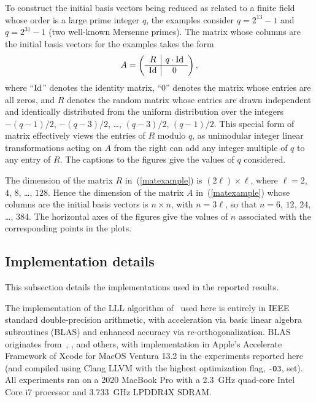 \documentclass{article}
\def\Id{\rm Id}
\begin{document}
To construct the initial basis vectors being reduced
as related to a finite field whose order is a large prime integer $q$,
the examples consider $q = 2^{13} - 1$ and $q = 2^{31} - 1$
(two well-known Mersenne primes).
The matrix whose columns are the initial basis vectors for the examples
takes the form
%
\begin{equation}
\label{matexample}
A = \left( \begin{array}{c|c} R & q \cdot \Id \\\hline
                              \Id & 0 \end{array} \right),
\end{equation}
%
where ``$\Id$'' denotes the identity matrix,
``$0$'' denotes the matrix whose entries are all zeros,
and $R$ denotes the random matrix whose entries are drawn
independent and identically distributed from the uniform distribution
over the integers $-(q-1)/2$, $-(q-3)/2$, \dots, $(q-3)/2$, $(q-1)/2$.
This special form of matrix effectively views the entries of $R$ modulo $q$,
as unimodular integer linear transformations acting on $A$ from the right
can add any integer multiple of $q$ to any entry of $R$.
The captions to the figures give the values of $q$ considered.

The dimension of the matrix $R$ in~(\ref{matexample}) is
$(2 \ell) \times \ell$, where $\ell = 2$, $4$, $8$, \dots, $128$.
Hence the dimension of the matrix $A$ in~(\ref{matexample}) whose columns
are the initial basis vectors is $n \times n$, with $n = 3 \ell$,
so that $n = 6$, $12$, $24$, \dots, $384$.
The horizontal axes of the figures give the values of $n$
associated with the corresponding points in the plots.

\subsection{Implementation details}
\label{implementation}

This subsection details the implementations used in the reported results.

The implementation of the LLL algorithm of~\cite{lenstra-lenstra-lovasz}
used here is entirely in IEEE standard double-precision arithmetic,
with acceleration via basic linear algebra subroutines (BLAS)
and enhanced accuracy via re-orthogonalization.
BLAS originates from~\cite{lawson-hanson-kincaid-krogh},
\cite{blas}, and others, with implementation in Apple's Accelerate Framework
of Xcode for MacOS Ventura 13.2 in the experiments reported here
(and compiled using Clang LLVM with the highest optimization flag,
{\tt -O3}, set). All experiments ran on a 2020 MacBook Pro
with a 2.3~GHz quad-core Intel Core i7 processor
and 3.733~GHz LPDDR4X SDRAM.
\end{document}
